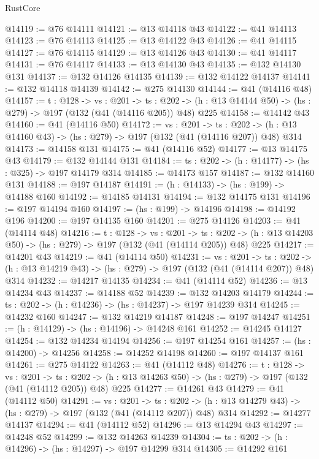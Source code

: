 \begin{lexlean}{RustCore}
\begin{coremodule}
@14119 := @76 @14111
@14121 := @13 @14118 @43
@14122 := @41 @14113
@14123 := @76 @14113
@14125 := @13 @14122 @43
@14126 := @41 @14115
@14127 := @76 @14115
@14129 := @13 @14126 @43
@14130 := @41 @14117
@14131 := @76 @14117
@14133 := @13 @14130 @43
@14135 := @132 @14130 @131
@14137 := @132 @14126 @14135
@14139 := @132 @14122 @14137
@14141 := @132 @14118 @14139
@14142 := @275 @14130
@14144 := @41 (@14116 @48)
@14157 := {t : @128} ->
  {vs : @201} ->
  {ts : @202} -> (h : @13 @14144 @50) -> (hs : @279) -> @197 (@132 (@41 (@14116 @205)) @48) @225
@14158 := @14142 @43
@14160 := @41 (@14116 @50)
@14172 := {vs : @201} ->
  {ts : @202} -> (h : @13 @14160 @43) -> (hs : @279) -> @197 (@132 (@41 (@14116 @207)) @48) @314
@14173 := @14158 @131
@14175 := @41 (@14116 @52)
@14177 := @13 @14175 @43
@14179 := @132 @14144 @131
@14184 := {ts : @202} -> (h : @14177) -> (hs : @325) -> @197 @14179 @314
@14185 := @14173 @157
@14187 := @132 @14160 @131
@14188 := @197 @14187
@14191 := (h : @14133) -> (hs : @199) -> @14188 @160
@14192 := @14185 @14131
@14194 := @132 @14175 @131
@14196 := @197 @14194 @160
@14197 := (hs : @199) -> @14196
@14198 := @14192 @196
@14200 := @197 @14135 @160
@14201 := @275 @14126
@14203 := @41 (@14114 @48)
@14216 := {t : @128} ->
  {vs : @201} ->
  {ts : @202} -> (h : @13 @14203 @50) -> (hs : @279) -> @197 (@132 (@41 (@14114 @205)) @48) @225
@14217 := @14201 @43
@14219 := @41 (@14114 @50)
@14231 := {vs : @201} ->
  {ts : @202} -> (h : @13 @14219 @43) -> (hs : @279) -> @197 (@132 (@41 (@14114 @207)) @48) @314
@14232 := @14217 @14135
@14234 := @41 (@14114 @52)
@14236 := @13 @14234 @43
@14237 := @14188 @52
@14239 := @132 @14203 @14179
@14244 := {ts : @202} -> (h : @14236) -> (hs : @14237) -> @197 @14239 @314
@14245 := @14232 @160
@14247 := @132 @14219 @14187
@14248 := @197 @14247
@14251 := (h : @14129) -> (hs : @14196) -> @14248 @161
@14252 := @14245 @14127
@14254 := @132 @14234 @14194
@14256 := @197 @14254 @161
@14257 := (hs : @14200) -> @14256
@14258 := @14252 @14198
@14260 := @197 @14137 @161
@14261 := @275 @14122
@14263 := @41 (@14112 @48)
@14276 := {t : @128} ->
  {vs : @201} ->
  {ts : @202} -> (h : @13 @14263 @50) -> (hs : @279) -> @197 (@132 (@41 (@14112 @205)) @48) @225
@14277 := @14261 @43
@14279 := @41 (@14112 @50)
@14291 := {vs : @201} ->
  {ts : @202} -> (h : @13 @14279 @43) -> (hs : @279) -> @197 (@132 (@41 (@14112 @207)) @48) @314
@14292 := @14277 @14137
@14294 := @41 (@14112 @52)
@14296 := @13 @14294 @43
@14297 := @14248 @52
@14299 := @132 @14263 @14239
@14304 := {ts : @202} -> (h : @14296) -> (hs : @14297) -> @197 @14299 @314
@14305 := @14292 @161

\end{coremodule}
\end{lexlean}
